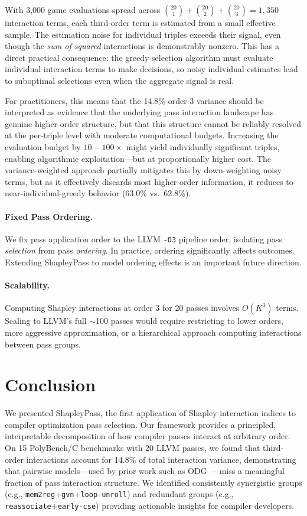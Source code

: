 \documentclass[preprint]{article}
\begin{document}
With 3{,}000 game evaluations spread across $\binom{20}{1} + \binom{20}{2} + \binom{20}{3} = 1{,}350$ interaction terms, each third-order term is estimated from a small effective sample. The estimation noise for individual triples exceeds their signal, even though the \emph{sum of squared} interactions is demonstrably nonzero. This has a direct practical consequence: the greedy selection algorithm must evaluate individual interaction terms to make decisions, so noisy individual estimates lead to suboptimal selections even when the aggregate signal is real.

For practitioners, this means that the 14.8\% order-3 variance should be interpreted as evidence that the underlying pass interaction landscape has genuine higher-order structure, but that this structure cannot be reliably resolved at the per-triple level with moderate computational budgets. Increasing the evaluation budget by $10{-}100\times$ might yield individually significant triples, enabling algorithmic exploitation---but at proportionally higher cost. The variance-weighted approach partially mitigates this by down-weighting noisy terms, but as it effectively discards most higher-order information, it reduces to near-individual-greedy behavior (63.0\% vs.\ 62.8\%).

\paragraph{Fixed Pass Ordering.}
We fix pass application order to the LLVM \texttt{-O3} pipeline order, isolating pass \emph{selection} from pass \emph{ordering}. In practice, ordering significantly affects outcomes. Extending ShapleyPass to model ordering effects is an important future direction.

\paragraph{Scalability.}
Computing Shapley interactions at order 3 for 20 passes involves $O(K^3)$ terms. Scaling to LLVM's full $\sim$100 passes would require restricting to lower orders, more aggressive approximation, or a hierarchical approach computing interactions between pass groups.

\section{Conclusion}
\label{sec:conclusion}

We presented ShapleyPass, the first application of Shapley interaction indices to compiler optimization pass selection. Our framework provides a principled, interpretable decomposition of how compiler passes interact at arbitrary order. On 15 PolyBench/C benchmarks with 20 LLVM passes, we found that third-order interactions account for 14.8\% of total interaction variance, demonstrating that pairwise models---used by prior work such as ODG~\citep{gao2024odg}---miss a meaningful fraction of pass interaction structure. We identified consistently synergistic groups (e.g., \texttt{mem2reg}+\texttt{gvn}+\texttt{loop-unroll}) and redundant groups (e.g., \texttt{reassociate}+\texttt{early-cse}) providing actionable insights for compiler developers.
\end{document}
